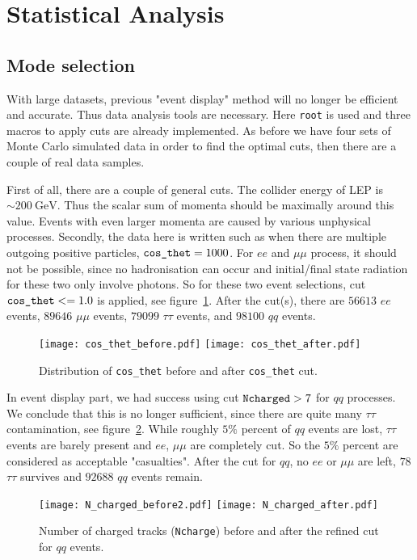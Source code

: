 \clearpage
\section{Statistical Analysis}
\subsection{Mode selection}
With large datasets, previous "event display" method will no longer be efficient and accurate. Thus data analysis tools are necessary. Here \verb|root| is used and three macros to apply cuts are already implemented. As before we have four sets of Monte Carlo simulated data in order to find the optimal cuts, then there are a couple of real data samples.

First of all, there are a couple of general cuts. The collider energy of LEP is $\sim\SI{200}{\giga\eV}$. Thus the scalar sum of momenta should be maximally around this value. Events with even larger momenta are caused by various unphysical processes. Secondly, the data here is written such as when there are multiple outgoing positive particles, $\verb|cos_thet|=1000$. For $ee$ and $\mu\mu$ process, it should not be possible, since no hadronisation can occur and initial/final state radiation for these two only involve photons. So for these two event selections, cut $\verb|cos_thet| <= 1.0$ is applied, see figure~\ref{fig:cos_thet_cut}. After the cut(s), there are $56613$ $ee$ events, $89646$ $\mu\mu$ events, $79099$ $\tau\tau$ events, and $98100$ $qq$ events.
\begin{figure}[ht]
	\centering
	\texttt{[image: cos\_thet\_before.pdf]}
	\texttt{[image: cos\_thet\_after.pdf]}
	\cprotect\caption{Distribution of \verb|cos_thet| before and after \verb|cos_thet| cut.}%
	\label{fig:cos_thet_cut}
\end{figure}

\clearpage
In event display part, we had success using cut $\verb|Ncharged| > 7$ for $qq$ processes. We conclude that this is no longer sufficient, since there are quite many $\tau\tau$ contamination, see figure~\ref{fig:qq_Ncharged_cuts}. While roughly $5\%$ percent of $qq$ events are lost, $\tau\tau$ events are barely present and $ee$, $\mu\mu$ are completely cut. So the $5\%$ percent are considered as acceptable "casualties". After the cut for $qq$, no $ee$ or $\mu\mu$ are left, $78$ $\tau\tau$ survives and $92688$ $qq$ events remain.
\begin{figure}[ht]
	\centering
	\texttt{[image: N\_charged\_before2.pdf]}
	\texttt{[image: N\_charged\_after.pdf]}
	\cprotect\caption{Number of charged tracks (\verb|Ncharge|) before and after the refined cut for $qq$ events.}%
	\label{fig:qq_Ncharged_cuts}
\end{figure}

